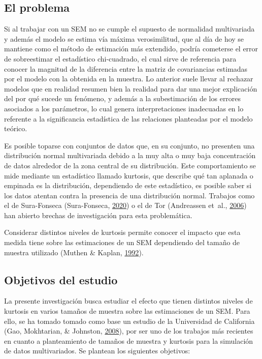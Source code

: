 \documentclass[
]{article}
\begin{document}
\subsection{El problema}

Si al trabajar con un SEM no se cumple el supuesto de normalidad
multivariada y además el modelo se estima vía máxima verosimilitud, que
al día de hoy se mantiene como el método de estimación más extendido,
podría cometerse el error de sobreestimar el estadístico chi-cuadrado,
el cual sirve de referencia para conocer la magnitud de la diferencia
entre la matriz de covariancias estimadas por el modelo con la obtenida
en la muestra. Lo anterior suele llevar al rechazar modelos que en
realidad resumen bien la realidad para dar una mejor explicación del por
qué sucede un fenómeno, y además a la subestimación de los errores
asociados a los parámetros, lo cual genera interpretaciones inadecuadas
en lo referente a la significancia estadística de las relaciones
planteadas por el modelo teórico.

Es posible toparse con conjuntos de datos que, en su conjunto, no
presenten una distribución normal multivariada debido a la muy alta o
muy baja concentración de datos alrededor de la zona central de su
distribución. Este comportamiento se mide mediante un estadístico
llamado kurtosis, que describe qué tan aplanada o empinada es la
distribución, dependiendo de este estadístico, es posible saber si los
datos atentan contra la presencia de una distribución normal. Trabajos
como el de Sura-Fonseca (Sura-Fonseca,
\protect\hyperlink{ref-sura}{2020}) o el de Tor (Andreassen et~al.,
\protect\hyperlink{ref-andreassen}{2006}) han abierto brechas de
investigación para esta problemática.

Considerar distintos niveles de kurtosis permite conocer el impacto que
esta medida tiene sobre las estimaciones de un SEM dependiendo del
tamaño de muestra utilizado (Muthen \& Kaplan,
\protect\hyperlink{ref-muthen}{1992}).

\subsection{Objetivos del estudio}

La presente investigación busca estudiar el efecto que tienen distintos
niveles de kurtosis en varios tamaños de muestra sobre las estimaciones
de un SEM. Para ello, se ha tomado tomado como base un estudio de la
Universidad de California (Gao, Mokhtarian, \& Johnston,
\protect\hyperlink{ref-gao}{2008}), por ser uno de los trabajos más
recientes en cuanto a planteamiento de tamaños de muestra y kurtosis
para la simulación de datos multivariados. Se plantean los siguientes
objetivos:
\end{document}
